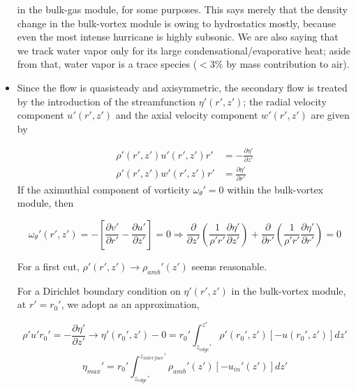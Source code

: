 \documentclass[preprint, prX]{revtex4}
\newcommand{\pd}[2]{\frac{\partial#1}{\partial#2}}
\newcommand{\zedge}{z_{edge}}
\newcommand{\zinter}{z_{interface}}
\begin{document}
\begin{itemize}
in the bulk-gas module, for some purposes. This says merely that the density change in the bulk-vortex module is owing to hydrostatics mostly, because even the most intense hurricane is highly subsonic. We are also saying that we track water vapor only for its large condensational/evaporative heat; aside from that, water vapor is a trace species ($<3 \%$ by mass contribution to air).

\item Since the flow is quasisteady and axisymmetric, the secondary flow is treated by the introduction of the streamfunction $\eta'(r',z')$;  the radial velocity component $u'(r',z')$ and the axial velocity component $w'(r',z')$ are given by

\begin{equation}
\begin{split}
	\rho'(r',z')u'(r',z')r' &= -\pd{ \eta'}{ z'} \\
	\rho'(r',z')w'(r',z')r' &= \pd{ \eta'}{ r'}
\end{split}
\end{equation}
If the aximuthial component of vorticity $\omega_\theta' = 0$ within the bulk-vortex module, then

\begin{equation}
	\omega_\theta'(r',z') = - \left [  \pd{ v'}{ r'} - \pd{ u'}{ z'}\right ] = 0 \Rightarrow \pd{}{ z'} \left ( \frac{1}{\rho' r'} \pd{ \eta'}{ z'} \right ) + \pd{}{ r'} \left ( \frac{1}{\rho' r'}\pd{ \eta'}{ r'} \right ) = 0
\end{equation}

For a first cut, $\rho'(r',z') \rightarrow \rho_{amb}'(z')$ seems reasonable.

\begin{figure}[h!]
	\centering
	\def\svgwidth{0.7\columnwidth}
	
\end{figure}

For a Dirichlet boundary condition on $\eta ' (r',z')$ in the bulk-vortex module, at $r' = r_0'$, we adopt as an approximation,

\begin{equation}
	\rho' u' r_0' = -\pd{ \eta'}{ z'} \rightarrow \eta'(r_0', z') - 0 = r_0' \int_{\zedge'}^{z'} \rho'(r_0', z')[- u(r_0', z')] dz'
\end{equation}
\begin{equation}
	\eta_{max}' = r_0' \int_{\zedge'}^{\zinter'} \rho_{amb}'(z') [-u_{in}'(z') ] dz'
\end{equation}


\end{itemize}
\end{document}

